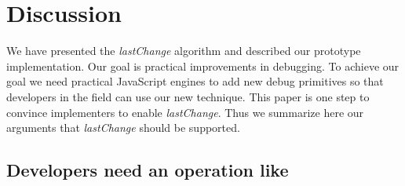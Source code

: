 \documentclass{sig-alternate}
\begin{document}
\section{Discussion}

We have presented the \textit{lastChange} algorithm and described our
prototype implementation. Our goal is practical improvements in debugging. To achieve our goal we need practical JavaScript engines
to add new debug primitives so that developers in the field can use our new technique. This paper is
one step to convince implementers to enable \textit{lastChange}.
Thus we summarize here our arguments that \textit{lastChange} should be supported.


\subsection{Developers need an operation like  }

\end{document}

